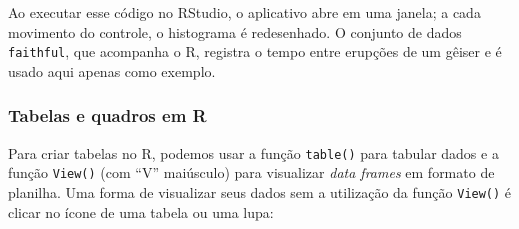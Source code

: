 \documentclass[
]{book}
\newenvironment{Shaded}{\begin{snugshade}}{\end{snugshade}}
\newcommand{\AttributeTok}[1]{\textcolor[rgb]{0.13,0.29,0.53}{#1}}
\newcommand{\ControlFlowTok}[1]{\textcolor[rgb]{0.13,0.29,0.53}{\textbf{#1}}}
\newcommand{\DecValTok}[1]{\textcolor[rgb]{0.00,0.00,0.81}{#1}}
\newcommand{\FunctionTok}[1]{\textcolor[rgb]{0.13,0.29,0.53}{\textbf{#1}}}
\newcommand{\NormalTok}[1]{#1}
\newcommand{\OtherTok}[1]{\textcolor[rgb]{0.56,0.35,0.01}{#1}}
\newcommand{\SpecialCharTok}[1]{\textcolor[rgb]{0.81,0.36,0.00}{\textbf{#1}}}
\newcommand{\StringTok}[1]{\textcolor[rgb]{0.31,0.60,0.02}{#1}}
\begin{document}
\begin{Shaded}
\end{Shaded}

Ao executar esse código no RStudio, o aplicativo abre em uma janela; a cada movimento do controle, o histograma é redesenhado. O conjunto de dados \texttt{faithful}, que acompanha o R, registra o tempo entre erupções de um gêiser e é usado aqui apenas como exemplo.

\subsubsection{Tabelas e quadros em R}\label{tabelas-e-quadros-em-r}

Para criar tabelas no R, podemos usar a função \texttt{table()} para tabular dados e a função \texttt{View()} (com ``V'' maiúsculo) para visualizar \emph{data frames} em formato de planilha. Uma forma de visualizar seus dados sem a utilização da função \texttt{View()} é clicar no ícone de uma tabela ou uma lupa:
\end{document}
